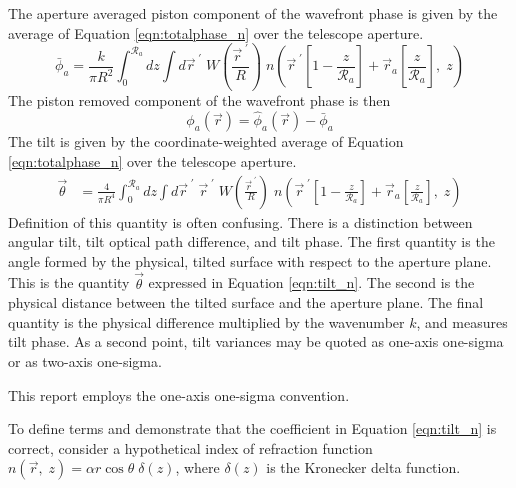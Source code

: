 The aperture averaged piston component of the wavefront phase is given by the average of
Equation \ref{eqn:totalphase_n} over the telescope aperture.
\begin{equation}\label{eqn:pistonphase_n}
\bar{\phi}_{a} = \frac{k}{\pi R^{2}} \int_{0}^{\mathcal{R}_{a}} dz 
\int d\vec{r}^{\;\prime} \; 
W \left( \frac{\vec{r}^{\;\prime}}{R} \right) \;
n
\left( \vec{r}^{\;\prime} \left[ 1 - \frac{z}{\mathcal{R}_{a}} \right] + 
\vec{r}_{a} \left[ \frac{z}{\mathcal{R}_{a}} \right], \; z \right)
\end{equation}
The piston removed component of the wavefront phase is then
\begin{equation}\label{eqn:prphase_n}
\phi_{a}\left(\vec{r}\right) = \hat{\phi}_{a}\left(\vec{r}\right) - \bar{\phi}_{a}
\end{equation}
The tilt is given by the coordinate-weighted average of Equation
\ref{eqn:totalphase_n} over the telescope aperture.
\begin{equation}\label{eqn:tilt_n}
\begin{aligned}
\vec{\theta} &= \frac{4}{\pi R^{4}} \int_{0}^{\mathcal{R}_{a}} dz 
\int d\vec{r}^{\;\prime} \; \vec{r}^{\;\prime} \;
W \left( \frac{\vec{r}^{\;\prime}}{R} \right) \;
n
\left( \vec{r}^{\;\prime} \left[ 1 - \frac{z}{\mathcal{R}_{a}} \right]
 + 
\vec{r}_{a} \left[ \frac{z}{\mathcal{R}_{a}} \right], \;z \right)
\end{aligned}
\end{equation}
Definition of this quantity is often confusing.  There is a
distinction between angular tilt, tilt optical path difference, and
tilt phase.  The first quantity is the angle formed by the physical,
tilted surface with respect to the aperture plane.  This is the
quantity $\vec{\theta}$ expressed in Equation \ref{eqn:tilt_n}.
The second is the physical distance between the tilted surface and the
aperture plane.  The final quantity is the physical difference
multiplied by the wavenumber $k$, and measures tilt phase.  As a
second point, tilt variances may be quoted as one-axis one-sigma or as
two-axis one-sigma.  
\begin{notes}
This report employs the one-axis one-sigma convention.  
\end{notes}
To define terms and demonstrate that the coefficient in
Equation \ref{eqn:tilt_n} is correct, consider a hypothetical index of
refraction function $n(\vec{r}, \;z) = \alpha r \cos
\theta \;\delta\left(z\right)$, where $\delta\left(z\right)$ is the
Kronecker delta function.
\begin{notes}
\end{notes}
